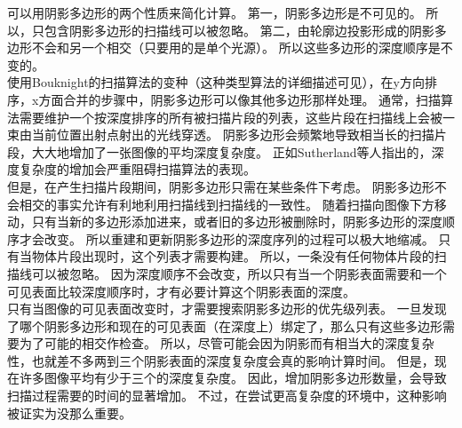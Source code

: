 可以用阴影多边形的两个性质来简化计算。
第一，阴影多边形是不可见的。
所以，只包含阴影多边形的扫描线可以被忽略。
第二，由轮廓边投影形成的阴影多边形不会和另一个相交（只要用的是单个光源）。
所以这些多边形的深度顺序是不变的。\\
使用Bouknight的扫描算法的变种（这种类型算法的详细描述可见\cite{4}\cite{12}），在y方向排序，x方面合并的步骤中，阴影多边形可以像其他多边形那样处理。
通常，扫描算法需要维护一个按深度排序的所有被扫描片段的列表，这些片段在扫描线上会被一束由当前位置出射点射出的光线穿透。
阴影多边形会频繁地导致相当长的扫描片段，大大地增加了一张图像的平均深度复杂度。
正如Sutherland等人\cite{12}指出的，深度复杂度的增加会严重阻碍扫描算法的表现。\\
但是，在产生扫描片段期间，阴影多边形只需在某些条件下考虑。
阴影多边形不会相交的事实允许有利地利用扫描线到扫描线的一致性。
随着扫描向图像下方移动，只有当新的多边形添加进来，或者旧的多边形被删除时，阴影多边形的深度顺序才会改变。
所以重建和更新阴影多边形的深度序列的过程可以极大地缩减。
只有当物体片段出现时，这个列表才需要构建。
所以，一条没有任何物体片段的扫描线可以被忽略。
因为深度顺序不会改变，所以只有当一个阴影表面需要和一个可见表面比较深度顺序时，才有必要计算这个阴影表面的深度。\\
只有当图像的可见表面改变时，才需要搜索阴影多边形的优先级列表。
一旦发现了哪个阴影多边形和现在的可见表面（在深度上）绑定了，那么只有这些多边形需要为了可能的相交作检查。
所以，尽管可能会因为阴影而有相当大的深度复杂性，也就差不多两到三个阴影表面的深度复杂度会真的影响计算时间。
但是，现在许多图像平均有少于三个的深度复杂度。
因此，增加阴影多边形数量，会导致扫描过程需要的时间的显著增加。
不过，在尝试更高复杂度的环境中，这种影响被证实为没那么重要。